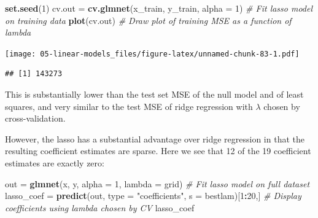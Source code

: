 \documentclass[openany]{book}
\newenvironment{Shaded}{\begin{snugshade}}{\end{snugshade}}
\newcommand{\CommentTok}[1]{\textcolor[rgb]{0.56,0.35,0.01}{\textit{#1}}}
\newcommand{\DataTypeTok}[1]{\textcolor[rgb]{0.13,0.29,0.53}{#1}}
\newcommand{\DecValTok}[1]{\textcolor[rgb]{0.00,0.00,0.81}{#1}}
\newcommand{\KeywordTok}[1]{\textcolor[rgb]{0.13,0.29,0.53}{\textbf{#1}}}
\newcommand{\NormalTok}[1]{#1}
\newcommand{\OperatorTok}[1]{\textcolor[rgb]{0.81,0.36,0.00}{\textbf{#1}}}
\newcommand{\StringTok}[1]{\textcolor[rgb]{0.31,0.60,0.02}{#1}}
\begin{document}
\begin{Shaded}
\begin{Highlighting}[]
\KeywordTok{set.seed}\NormalTok{(}\DecValTok{1}\NormalTok{)}
\NormalTok{cv.out =}\StringTok{ }\KeywordTok{cv.glmnet}\NormalTok{(x_train, y_train, }\DataTypeTok{alpha =} \DecValTok{1}\NormalTok{) }\CommentTok{# Fit lasso model on training data}
\KeywordTok{plot}\NormalTok{(cv.out) }\CommentTok{# Draw plot of training MSE as a function of lambda}
\end{Highlighting}
\end{Shaded}

\texttt{[image: 05-linear-models\_files/figure-latex/unnamed-chunk-83-1.pdf]}

\begin{Shaded}
\end{Shaded}

\begin{verbatim}
## [1] 143273
\end{verbatim}

This is substantially lower than the test set MSE of the null model and of
least squares, and very similar to the test MSE of ridge regression with \(\lambda\)
chosen by cross-validation.

However, the lasso has a substantial advantage over ridge regression in
that the resulting coefficient estimates are sparse. Here we see that 12 of
the 19 coefficient estimates are exactly zero:

\begin{Shaded}
\begin{Highlighting}[]
\NormalTok{out =}\StringTok{ }\KeywordTok{glmnet}\NormalTok{(x, y, }\DataTypeTok{alpha =} \DecValTok{1}\NormalTok{, }\DataTypeTok{lambda =}\NormalTok{ grid) }\CommentTok{# Fit lasso model on full dataset}
\NormalTok{lasso_coef =}\StringTok{ }\KeywordTok{predict}\NormalTok{(out, }\DataTypeTok{type =} \StringTok{"coefficients"}\NormalTok{, }\DataTypeTok{s =}\NormalTok{ bestlam)[}\DecValTok{1}\OperatorTok{:}\DecValTok{20}\NormalTok{,] }\CommentTok{# Display coefficients using lambda chosen by CV}
\NormalTok{lasso_coef}
\end{Highlighting}
\end{Shaded}
\end{document}
